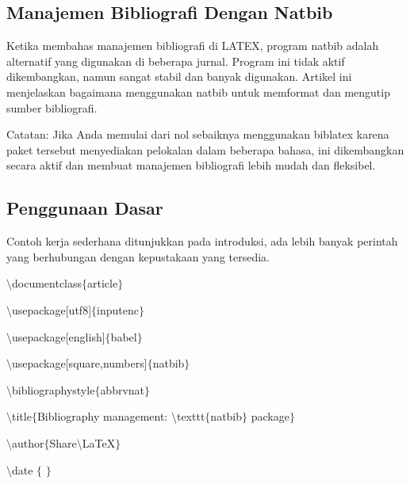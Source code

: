 \begin{itemize}
\begin{itemize}
\subsection{Manajemen Bibliografi Dengan Natbib}
\vspace{\baselineskip}
Ketika membahas manajemen bibliografi di LATEX, program natbib adalah alternatif yang digunakan di beberapa jurnal. Program ini tidak aktif dikembangkan, namun sangat stabil dan banyak digunakan. Artikel ini menjelaskan bagaimana menggunakan natbib untuk memformat dan mengutip sumber bibliografi.\par
\vspace{\baselineskip}
Catatan: Jika Anda memulai dari nol sebaiknya menggunakan biblatex karena paket tersebut menyediakan pelokalan dalam beberapa bahasa, ini dikembangkan secara aktif dan membuat manajemen bibliografi lebih mudah dan fleksibel.\par
\vspace{\baselineskip}
\subsection{Penggunaan Dasar}
\vspace{\baselineskip}
Contoh kerja sederhana ditunjukkan pada introduksi, ada lebih banyak perintah yang berhubungan dengan kepustakaan yang tersedia.\par
\vspace{\baselineskip}
\hspace*{0.5in}$\setminus$documentclass$ \{ $article$ \} $\par

$\setminus$usepackage[utf8]$ \{ $inputenc$ \} $\par

$\setminus$usepackage[english]$ \{ $babel$ \} $\par

$\setminus$usepackage[square,numbers]$ \{ $natbib$ \} $\par

$\setminus$bibliographystyle$ \{ $abbrvnat$ \} $\par

$\setminus$title$ \{ $Bibliography management: $\setminus$texttt$ \{ $natbib$ \} $ package$ \} $\par

$\setminus$author$ \{ $Share$\setminus$LaTeX$ \} $\par

$\setminus$date $ \{ $ $ \} $\par


\end{itemize}
\end{itemize}
